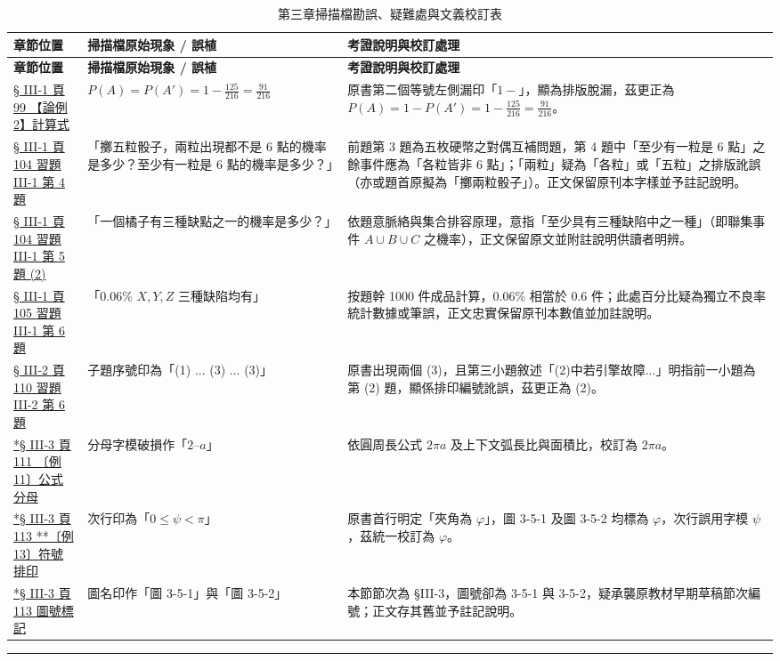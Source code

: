 \documentclass[a4paper,12pt,twoside]{article}
\begin{document}
\small
\renewcommand{\arraystretch}{1.35}
\begin{xltabular}{\textwidth}{|p{3.2cm}|p{3.8cm}|X|}
\caption{第三章掃描檔勘誤、疑難處與文義校訂表}\label{tab:errata_b5_ch3} \\
\hline
\textbf{章節位置} & \textbf{掃描檔原始現象 / 誤植} & \textbf{考證說明與校訂處理} \\ \hline
\endfirsthead
\hline
\textbf{章節位置} & \textbf{掃描檔原始現象 / 誤植} & \textbf{考證說明與校訂處理} \\ \hline
\endhead
\hline
\endfoot

\hyperref[note:b5s-ch3-p99-pa]{§ III-1 頁 99 【論例 2】計算式} & 
$P(A) = P(A') = 1 - \frac{125}{216} = \frac{91}{216}$ & 
原書第二個等號左側漏印「$1-$」，顯為排版脫漏，茲更正為 $P(A) = 1 - P(A') = 1 - \frac{125}{216} = \frac{91}{216}$。 \\ \hline

\hyperref[note:b5s-ch3-p104-q4]{§ III-1 頁 104 習題 III-1 第 4 題} & 
「擲五粒骰子，兩粒出現都不是 6 點的機率是多少？至少有一粒是 6 點的機率是多少？」 & 
前題第 3 題為五枚硬幣之對偶互補問題，第 4 題中「至少有一粒是 6 點」之餘事件應為「各粒皆非 6 點」；「兩粒」疑為「各粒」或「五粒」之排版訛誤（亦或題首原擬為「擲兩粒骰子」）。正文保留原刊本字樣並予註記說明。 \\ \hline

\hyperref[note:b5s-ch3-p104-q5]{§ III-1 頁 104 習題 III-1 第 5 題 (2)} & 
「一個橘子有三種缺點之一的機率是多少？」 & 
依題意脈絡與集合排容原理，意指「至少具有三種缺陷中之一種」（即聯集事件 $A \cup B \cup C$ 之機率），正文保留原文並附註說明供讀者明辨。 \\ \hline

\hyperref[note:b5s-ch3-p105-q6]{§ III-1 頁 105 習題 III-1 第 6 題} & 
「0.06\% $X, Y, Z$ 三種缺陷均有」 & 
按題幹 1000 件成品計算，0.06\% 相當於 0.6 件；此處百分比疑為獨立不良率統計數據或筆誤，正文忠實保留原刊本數值並加註說明。 \\ \hline

\hyperref[note:b5s-ch3-p110-q6-subnum]{§ III-2 頁 110 習題 III-2 第 6 題} & 
子題序號印為「(1) ... (3) ... (3)」 & 
原書出現兩個 (3)，且第三小題敘述「(2)中若引擎故障...」明指前一小題為第 (2) 題，顯係排印編號訛誤，茲更正為 (2)。 \\ \hline

\hyperref[note:b5s-ch3-p111-2pia]{*§ III-3 頁 111 〔例 11〕公式分母} & 
分母字模破損作「$2\text{--}a$」 & 
依圓周長公式 $2\pi a$ 及上下文弧長比與面積比，校訂為 $2\pi a$。 \\ \hline

\hyperref[note:b5s-ch3-p113-phi]{*§ III-3 頁 113 **〔例 13〕符號排印} & 
次行印為「$0 \le \psi < \pi$」 & 
原書首行明定「夾角為 $\varphi$」，圖 3-5-1 及圖 3-5-2 均標為 $\varphi$，次行誤用字模 $\psi$，茲統一校訂為 $\varphi$。 \\ \hline

\hyperref[note:b5s-ch3-p113-fig-num]{*§ III-3 頁 113 圖號標記} & 
圖名印作「圖 3-5-1」與「圖 3-5-2」 & 
本節節次為 §III-3，圖號卻為 3-5-1 與 3-5-2，疑承襲原教材早期草稿節次編號；正文存其舊並予註記說明。 \\ \hline

\end{xltabular}

\vspace{1em}
\hrule
\vspace{1em}

\tableofcontents
\newpage


\end{document}
